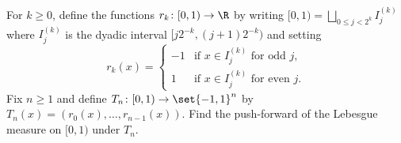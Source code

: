 \documentclass[12pt]{article}
\begin{document}
\begin{problem}
    For $k \ge 0$, define the functions $r_k\colon [0, 1) \to \R$ by
    writing $[0, 1) = \bigsqcup\limits_{0 \le j < 2^k} I_j^{(k)}$ where
    $I_j^{(k)}$ is the dyadic interval
    $[j2^{-k}, (j + 1)2^{-k})$ and setting \[
        r_k(x) = \begin{cases}
            -1 & \text{if } x \in I_j^{(k)} \text{ for odd } j, \\
            1 & \text{if } x \in I_j^{(k)} \text{ for even } j.
        \end{cases}
    \]
    Fix $n \ge 1$ and define $T_n\colon [0, 1) \to \set{-1, 1}^n$ by
    $T_n(x) = (r_0(x), \dots, r_{n-1}(x))$.
    Find the push-forward of the Lebesgue measure on $[0, 1)$ under $T_n$.
\end{problem}
\begin{solution}
    
\end{solution}
\end{document}
